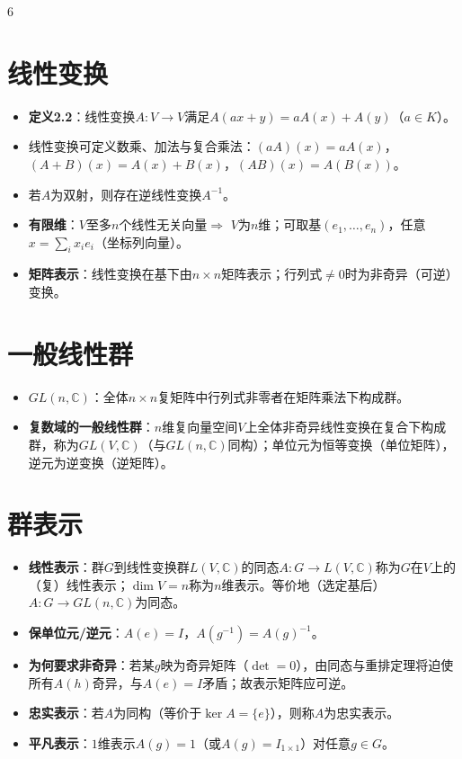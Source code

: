 \documentclass[landscape]{article}
\begin{document}
\begin{multicols*}{6}
\section*{线性变换}
\begin{itemize}
  \item \textbf{定义2.2}：线性变换$A:V\to V$满足$A(ax+y)=aA(x)+A(y)$（$a\in K$）。
  \item 线性变换可定义数乘、加法与复合乘法：$(aA)(x)=aA(x)$，$(A+B)(x)=A(x)+B(x)$，$(AB)(x)=A(B(x))$。
  \item 若$A$为双射，则存在逆线性变换$A^{-1}$。
  \item \textbf{有限维}：$V$至多$n$个线性无关向量$\Rightarrow$ $V$为$n$维；可取基$(e_1,\dots,e_n)$，任意$x=\sum_i x_i e_i$（坐标列向量）。
  \item \textbf{矩阵表示}：线性变换在基下由$n\times n$矩阵表示；行列式$\neq 0$时为非奇异（可逆）变换。
\end{itemize}

\section*{一般线性群}
\begin{itemize}
  \item \textbf{$GL(n,\mathbb{C})$}：{\color{red}全体}$n\times n$复矩阵中{\color{red}行列式非零者}在矩阵乘法下构成群。
  \item \textbf{复数域的一般线性群}：$n$维复向量空间$V$上全体非奇异线性变换在复合下构成群，称为$GL(V,\mathbb{C})$（与$GL(n,\mathbb{C})$同构）；单位元为恒等变换（单位矩阵），逆元为逆变换（逆矩阵）。
\end{itemize}

\section*{群表示}
\begin{itemize}
  \item \textbf{线性表示}：群$G$到线性变换群$L(V,\mathbb{C})$的{\color{red}同态}$A:G\to L(V,\mathbb{C})$称为$G$在$V$上的（复）线性表示；$\dim V=n$称为$n$维表示。等价地（选定基后）$A:G\to GL(n,\mathbb{C})$为同态。
  \item \textbf{保单位元/逆元}：$A(e)=I$，$A(g^{-1})=A(g)^{-1}$。
  \item \textbf{为何要求非奇异}：若某$g$映为奇异矩阵（$\det=0$），由同态与重排定理将迫使所有$A(h)$奇异，与$A(e)=I$矛盾；故表示矩阵应可逆。
  \item \textbf{忠实表示}：若$A$为{\color{red}同构}（等价于$\ker A=\{e\}$），则称$A$为忠实表示。
  \item \textbf{平凡表示}：$1$维表示$A(g)=1$（或$A(g)=I_{1\times1}$）对任意$g\in G$。
\end{itemize}


\end{multicols*}
\end{document}
